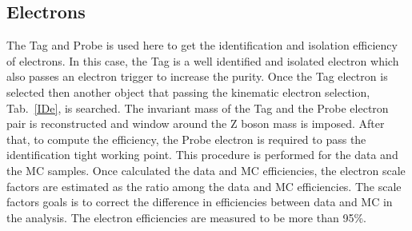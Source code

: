 \subsection*{Electrons} 
The   Tag and Probe is used here to get the identification and isolation efficiency of electrons. In this case, the Tag is a
well identified and isolated electron which also passes an electron trigger to increase the purity. 
Once the Tag electron is selected then another object that passing the kinematic electron selection, Tab.~\ref{IDe}, is searched. 
The invariant  mass of the Tag and the Probe electron pair is reconstructed
and window  around  the Z boson mass is imposed. 
After that, to compute the efficiency, the Probe electron is required  to pass the identification tight working point. 
This procedure is performed for the data and the MC samples. 
Once  calculated  the data and MC efficiencies,  the electron scale factors are estimated as the ratio among the data and MC efficiencies. 
The scale factors goals is to correct the difference in efficiencies between data and MC in the analysis. 
The  electron  efficiencies are measured to be  more than 95\%.


